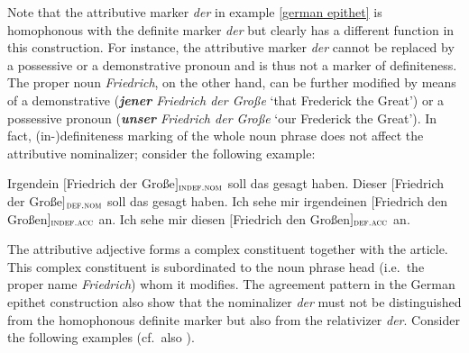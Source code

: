 Note that the attributive marker \textit{der} in example \ref{german epithet} is homophonous with the definite marker \textit{der} but clearly has a different function in this construction. For instance, the attributive marker \textit{der} cannot be replaced by a possessive or a demonstrative pronoun and is thus not a marker of definiteness. The proper noun \textit{Friedrich}, on the other hand, can be further modified by means of a demonstrative (\textit{\textbf{jener} Friedrich der Große} ‘that Frederick the Great’) or a possessive pronoun (\textit{\textbf{unser} Friedrich der Große} ‘our Frederick the Great’). In fact, (in-)definiteness marking of the whole noun phrase does not affect the attributive nominalizer; consider the following example:
\begin{exe}
\ex
{}
\begin{xlist}
\ex	Irgendein $[$Friedrich der Große$]_{\textsc{indef.nom}}$ soll das gesagt haben.
\ex	Dieser $[$Friedrich der Große$]$$_{\textsc{def.nom}}$ soll das gesagt haben. 
\ex	Ich sehe mir irgendeinen $[$Friedrich den Großen$]_{\textsc{indef.acc}}$ an.
\ex	Ich sehe mir diesen $[$Friedrich den Großen$]_{\textsc{def.acc}}$ an.
\end{xlist}
\end{exe}
The attributive adjective forms a complex constituent together with the article. This complex constituent is subordinated to the noun phrase head (i.e.~the proper name \textit{Friedrich}) whom it modifies. The agreement pattern in the German epithet construction also show that the nominalizer \textit{der} must not be distinguished from the homophonous definite marker but also from the relativizer \textit{der}. Consider the following examples (cf.~also \citealt[181]{himmelmann1997}).
\begin{exe}
\ex \label{article versus rel}
\begin{xlist}
\end{xlist}
\end{exe}

